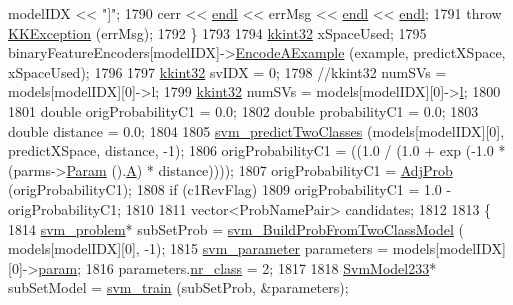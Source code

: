 \begin{DoxyCode}
      modelIDX << \textcolor{stringliteral}{"]"};
1790     cerr << \hyperlink{namespace_k_k_b_ad1f50f65af6adc8fa9e6f62d007818a8}{endl} << errMsg << \hyperlink{namespace_k_k_b_ad1f50f65af6adc8fa9e6f62d007818a8}{endl} << \hyperlink{namespace_k_k_b_ad1f50f65af6adc8fa9e6f62d007818a8}{endl};
1791     \textcolor{keywordflow}{throw} \hyperlink{class_k_k_b_1_1_k_k_exception}{KKException} (errMsg);
1792   \}
1793 
1794   \hyperlink{namespace_k_k_b_a8fa4952cc84fda1de4bec1fbdd8d5b1b}{kkint32}  xSpaceUsed;
1795   binaryFeatureEncoders[modelIDX]->\hyperlink{class_k_k_m_l_l_1_1_feature_encoder_af82278dec57d34f3ebcf6ea97cc625d2}{EncodeAExample} (example, predictXSpace, xSpaceUsed);
1796 
1797   \hyperlink{namespace_k_k_b_a8fa4952cc84fda1de4bec1fbdd8d5b1b}{kkint32}  svIDX = 0;
1798   \textcolor{comment}{//kkint32  numSVs = models[modelIDX][0]->l;}
1799   \hyperlink{namespace_k_k_b_a8fa4952cc84fda1de4bec1fbdd8d5b1b}{kkint32}  numSVs = models[modelIDX][0]->\hyperlink{struct_s_v_m233_1_1_svm_model233_ae37947940a05ecebb1352b6f365b4050}{l};
1800 
1801   \textcolor{keywordtype}{double}  origProbabilityC1 = 0.0;
1802   \textcolor{keywordtype}{double}  probabilityC1     = 0.0;
1803   \textcolor{keywordtype}{double}  distance          = 0.0;
1804 
1805   \hyperlink{namespace_s_v_m233_a558a3dbd2873b3211831500197cc7a59}{svm\_predictTwoClasses} (models[modelIDX][0], predictXSpace, distance, -1);
1806   origProbabilityC1 = ((1.0 / (1.0 + exp (-1.0 * (parms->\hyperlink{class_k_k_m_l_l_1_1_binary_class_parms_a8b29f264963789ce9145e8baa589b088}{Param} ().\hyperlink{struct_s_v_m233_1_1svm__parameter_ae77c2459a4305fca375197165412abe2}{A}) * distance))));
1807   origProbabilityC1 = \hyperlink{_s_v_m_model_8cpp_a40759ba6dc57dc1b738f1440a39eda2b}{AdjProb} (origProbabilityC1);
1808   \textcolor{keywordflow}{if}  (c1RevFlag)
1809     origProbabilityC1 = 1.0 - origProbabilityC1;
1810 
1811   vector<ProbNamePair>  candidates;
1812 
1813   \{
1814     \hyperlink{struct_s_v_m233_1_1svm__problem}{svm\_problem}*  subSetProb = \hyperlink{namespace_s_v_m233_a92802c240a20c37ae50a9d0eb6f74639}{svm\_BuildProbFromTwoClassModel}  (
      models[modelIDX][0], -1);
1815     \hyperlink{struct_s_v_m233_1_1svm__parameter}{svm\_parameter}  parameters = models[modelIDX][0]->\hyperlink{struct_s_v_m233_1_1_svm_model233_aea9d5d416f02777981c7677da2044571}{param};
1816     parameters.\hyperlink{struct_s_v_m233_1_1svm__parameter_a6fa48dd0b10a8f9cbbc8c0d571404345}{nr\_class} = 2;
1817 
1818     \hyperlink{struct_s_v_m233_1_1_svm_model233}{SvmModel233}*  subSetModel = \hyperlink{namespace_s_v_m233_a0f6331f1d29cc73bc32f39c104b8d74c}{svm\_train}  (subSetProb, &parameters);

\end{DoxyCode}

